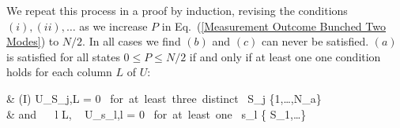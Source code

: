 \documentclass[aps,pra,twocolumn,showpacs,superscriptaddress,floatfix,10pt]{revtex4}
\begin{document}
	We repeat this process in a proof by induction, revising the conditions $(i), (ii), \dots$ as we increase $P$ in Eq.~(\ref{Measurement Outcome Bunched Two Modes}) to $N/2$. In all cases we find $(b)$ and $(c)$ can never be satisfied. $(a)$ is satisfied for all states $ 0 \le P \le N/2 $ if and only if at least one one condition holds for each column $L$ of $U$:
	\begin{flalign}
	& \small(I) \enspace U_{S_j,L} = 0 \mbox{ for at least three distinct } S_j \in \{1,\dots,N_a\} \nonumber \\
	& \small \quad \quad \quad \mbox{and } \forall \mbox{ } l \ne L, \mbox{ } U_{s_l,l} = 0 \mbox{ for at least one } s_l \in \{ S_1,\dots \} \nonumber
	\end{flalign}
\end{document}

